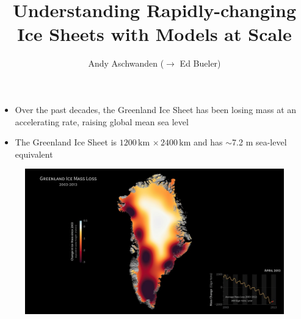 \documentclass[hide notes,intlimits]{beamer}
\title[] %
{Understanding Rapidly-changing Ice Sheets with Models at Scale}
\author[Aschwanden, Fahnestock, Truffer] %
{Andy Aschwanden ($\to$ Ed Bueler)}
\institute[Geophysical Institute] %
{}
\date{}
\begin{document}


  {
} 


\begin{frame}
  \titlepage
\end{frame}

{
%
} 

  {
} 

\begin{frame}[plain]
    \begin{itemize}
    \item Over the past decades, the Greenland Ice Sheet has been losing mass at an accelerating rate, raising global mean sea level
    \item The Greenland Ice Sheet is $1200\,\text{km}\,\times 2400\,\text{km}$ and has $\sim$7.2 m sea-level equivalent
    \end{itemize}
    \begin{figure}
      \includegraphics[width=12cm]{grace_greenland_2004_2012_still_print} \\
  \end{figure}
\end{frame}
\end{document}
